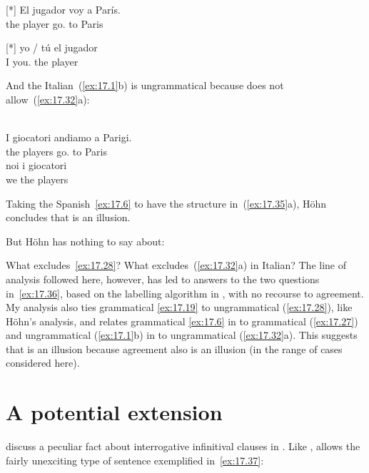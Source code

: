 \documentclass[output=paper]{langsci/langscibook}
\begin{document}
\begin{exe}
\exi{\eqref{ex:17.19}}[*]{%
    \gll El jugador voy a París.\\
        the player go.\Fsg{} to Paris\\
    \glt}
\end{exe}

\begin{exe}
\exi{\eqref{ex:17.28}}[*]{%
    \gll yo / tú el jugador\\
    I {} you.\Sg{} the player\\
    \glt}
\end{exe}
And the Italian~(\ref{ex:17.1}b) is ungrammatical because  does not
allow~(\ref{ex:17.32}a):

\begin{exe}[(32a)]
     \\
    \gll I giocatori andiamo a Parigi.\\
    the players go.\Fpl{} to Paris\\
    \glt
{}
    \gll    noi i giocatori\\
            we the players\\
    \glt
\end{exe}
Taking the Spanish~\eqref{ex:17.6} to have the structure in~(\ref{ex:17.35}a),
Höhn concludes that  is an illusion.

But Höhn has nothing to say about:

\ea\label{ex:17.36}
    \ea What excludes~\eqref{ex:17.28}?
    \ex What excludes~(\ref{ex:17.32}a) in Italian?
    \z
\z
The line of analysis followed here, however, has led to answers to the two
questions in~\eqref{ex:17.36}, based on the labelling algorithm in
\citet{Chomsky2013}, with no recourse to agreement. My analysis also ties
grammatical \eqref{ex:17.19} to ungrammatical (\ref{ex:17.28}), like Höhn’s
analysis, and relates grammatical \eqref{ex:17.6} in  to grammatical
(\ref{ex:17.27}) and ungrammatical (\ref{ex:17.1}b) in  to
ungrammatical (\ref{ex:17.32}a). This suggests that  is an
illusion because agreement also is an illusion (in the range of cases
considered here).

\section{A potential extension}\label{sec:17.8}

\citet{BosqueMoreno1984} discuss a peculiar fact about interrogative
infinitival clauses in . Like ,  allows the fairly
unexciting type of sentence exemplified in~\eqref{ex:17.37}:
\end{document}
